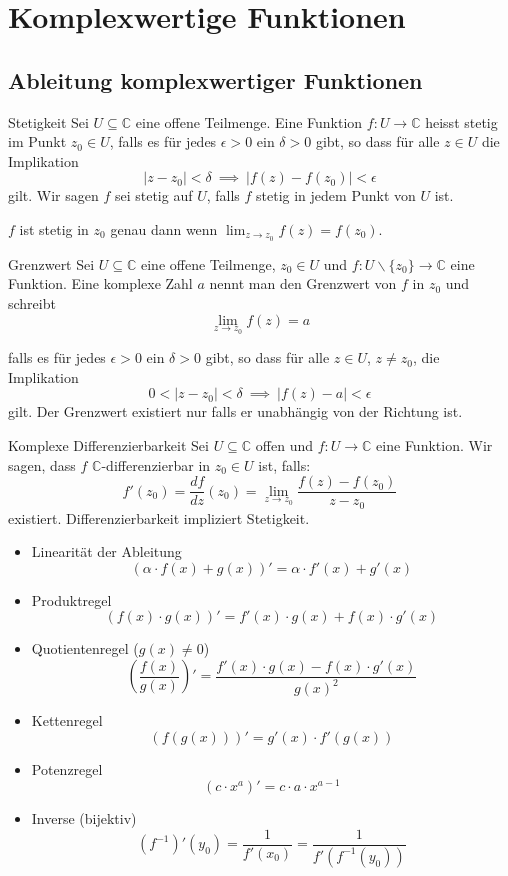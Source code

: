 \documentclass[a4paper,10pt]{article}
\def\C{\mathbb{C}}
\begin{document}
\section{Komplexwertige Funktionen}

\subsection{Ableitung komplexwertiger Funktionen}

\begin{subbox}{Stetigkeit}
  Sei \(U\subseteq\mathbb{C}\) eine offene Teilmenge. Eine Funktion \(f\colon U\to\mathbb{C}\) heisst stetig im Punkt \(z_0\in U\), falls es für jedes \(\epsilon>0\) ein \(\delta >0\) gibt, so dass für alle \(z\in U\) die Implikation \[|z-z_0|<\delta ~\implies ~ |f(z)-f(z_0)|< \epsilon\] gilt. Wir sagen \(f\) sei stetig auf \(U\), falls \(f\) stetig in jedem Punkt von \(U\) ist.

  $f$ ist stetig in $z_0$ genau dann wenn $\lim_{z \to z_0} f(z) = f(z_0)$.
\end{subbox}

\begin{subbox}{Grenzwert}
  Sei \(U\subseteq\mathbb{C}\) eine offene Teilmenge, \(z_0\in U\) und \(f\colon U\smallsetminus\{z_0\}\to\mathbb{C}\) eine Funktion. Eine komplexe Zahl \(a\) nennt man den Grenzwert von \(f\) in \(z_0\) und schreibt
  $$
  \lim_{z\to z_0}f(z)=a
  $$
  
  falls es für jedes \(\epsilon>0\) ein \(\delta>0\) gibt, so dass für alle \(z\in U\), \(z\neq z_0\), die Implikation 
  $$
  0<|z-z_0|<\delta ~\implies ~ |f(z)-a|<\epsilon
  $$ gilt. Der Grenzwert existiert nur falls er unabhängig von der Richtung ist.
\end{subbox}

\begin{subbox}{Komplexe Differenzierbarkeit}
  Sei \(U \subseteq \mathbb{C}\) offen und \(f \colon U \to \mathbb{C}\) eine Funktion. Wir sagen, dass \(f\) $\C$-differenzierbar in \(z_0 \in U\) ist, falls:
  $$
  f'(z_0) = \frac{df}{dz}(z_0) = \lim_{z \to z_0} \dfrac{f(z)-f(z_0)}{z-z_0}
  $$
  existiert. Differenzierbarkeit impliziert Stetigkeit.
\end{subbox}

\begin{itemize}
  \item Linearität der Ableitung
  $$(\alpha \cdot f(x) + g(x))' = \alpha \cdot f'(x) + g'(x)$$
  \item Produktregel
  $$(f(x) \cdot g(x))' = f'(x) \cdot g(x) + f(x) \cdot g'(x)$$
  \item Quotientenregel ($g(x) \neq 0$)
  $$\left(\frac{f(x)}{g(x)}\right)' = \frac{f'(x) \cdot g(x) - f(x) \cdot g'(x)}{g(x)^2}$$
  \item Kettenregel
  $$(f(g(x)))' = g'(x) \cdot f'(g(x))$$
  \item Potenzregel
  $$(c \cdot x^a)' = c \cdot a \cdot x^{a - 1}$$
  \item{
    Inverse (bijektiv)
    $$
    (f^{-1})'(y_0) = \frac{1}{f'(x_0)} = \frac{1}{f'(f^{-1}(y_0))}
    $$
  }
\end{itemize}
\end{document}
